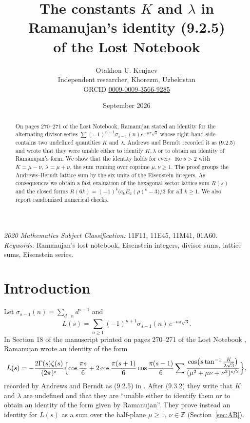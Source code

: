 \documentclass[11pt]{article}
\title{The constants $K$ and $\lambda$ in Ramanujan's identity (9.2.5)\\ of the Lost Notebook}
\author{Otakhon U. Kenjaev\\ \small Independent researcher, Khorezm, Uzbekistan\\
\small ORCID \href{https://orcid.org/0009-0009-3566-9285}{0009-0009-3566-9285}}
\date{September 2026}
\theoremstyle{remark}
\begin{document}
\maketitle

\begin{abstract}
On pages 270--271 of the Lost Notebook, Ramanujan stated an identity for the alternating divisor series
$\sum(-1)^{n+1}\sigma_{s-1}(n)e^{-n\pi\sqrt3}$ whose right-hand side contains two undefined quantities $K$ and $\lambda$.
Andrews and Berndt recorded it as (9.2.5) and wrote that they were unable either to identify $K,\lambda$ or to obtain an identity
of Ramanujan's form. We show that the identity holds for every $\operatorname{Re}s>2$ with $K=\mu-\nu$, $\lambda=\mu+\nu$, the sum
running over coprime $\mu,\nu\ge1$. The proof groups the Andrews--Berndt lattice sum by the six units of the Eisenstein integers.
As consequences we obtain a fast evaluation of the hexagonal sector lattice sum $R(s)$ and the closed forms
$R(6k)=(-1)^k\bigl(c_kE_6(\rho)^k-3\bigr)/3$ for all $k\ge1$. We also report randomized numerical checks.
\end{abstract}

\noindent\textit{2020 Mathematics Subject Classification:} 11F11, 11E45, 11M41, 01A60.\\
\textit{Keywords:} Ramanujan's lost notebook, Eisenstein integers, divisor sums, lattice sums, Eisenstein series.

\section{Introduction}
Let $\sigma_{s-1}(n)=\sum_{d\mid n}d^{s-1}$ and
\begin{equation}\label{eq:L}
L(s)=\sum_{n\ge1}(-1)^{n+1}\sigma_{s-1}(n)\,e^{-n\pi\sqrt3}.
\end{equation}
In Section 18 of the manuscript printed on pages 270--271 of the Lost Notebook \cite{LN}, Ramanujan wrote an identity of the form
\begin{equation}\label{eq:R925}
L(s)=-\frac{2\Gamma(s)\zeta(s)}{(2\pi)^s}\Bigl\{\cos\frac{\pi s}{6}+2\cos\frac{\pi(s+1)}{6}\cos\frac{\pi(s-1)}{6}
\sum\frac{\cos\bigl(s\tan^{-1}\frac{K}{\lambda\sqrt3}\bigr)}{(\mu^2+\mu\nu+\nu^2)^{s/2}}\Bigr\},
\end{equation}
recorded by Andrews and Berndt as (9.2.5) in \cite[\S9.2]{AB4}. After (9.3.2) they write that $K$ and $\lambda$ are undefined and that
they are ``unable either to identify them or to obtain an identity of the form given by Ramanujan''. They prove instead an identity
for $L(s)$ as a sum over the half-plane $\mu\ge1$, $\nu\in\mathbb Z$ (Section~\ref{sec:AB}).
\end{document}
